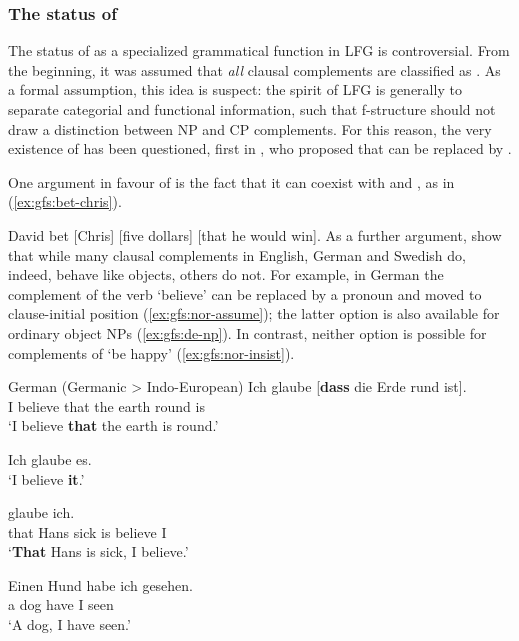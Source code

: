 \documentclass[output=paper]{../langscibook}
\begin{document}
 \subsubsection{The status of \COMP\label{sect:gfs:comp}}
 
 The status of \COMP as a specialized grammatical function in LFG is controversial. From the beginning, it was assumed that \textit{all} clausal complements are classified as \COMP \citep{kaplan-zaenen1989-fprec,BresnanEtAl2016}. As a formal assumption, this idea is suspect: the spirit of LFG is generally to separate categorial and functional information, such that f-structure should not draw a distinction between NP and CP complements. For this reason, the very existence of \COMP has been questioned, first in \citet{AlsinaMohananMohanan1996}, who proposed that \COMP can be replaced by \OBJ.
 
 One argument in favour of \COMP is the fact that it can coexist with \OBJ and {\OBJTHETA}, as in (\ref{ex:gfs:bet-chris}).
 
 \ea\label{ex:gfs:bet-chris}
    David bet [Chris]\textsubscript{\OBJ} [five dollars]\textsubscript{{}} [that he would win]\textsubscript{\COMP}.
 \z
As a further argument, \citet{DL00} show that while many clausal complements in English, German and Swedish do, indeed, behave like objects, others do not. For example, in German the complement of the verb `believe' can be replaced by a pronoun and moved to clause-initial position (\ref{ex:gfs:nor-assume}); the latter option is also available for ordinary object NPs (\ref{ex:gfs:de-np}). In contrast, neither option is possible for complements of `be happy' (\ref{ex:gfs:nor-insist}).
 
 \ea German (Germanic > Indo-European)\label{ex:gfs:nor-assume}
    \ea
        \gll Ich glaube [\textbf{dass} die Erde rund ist].\\
        I believe \phantom{[}that the earth round is\\
        \glt `I believe \textbf{that} the earth is round.'
        
        \ex Ich glaube es.\\
        `I believe \textbf{it}.'
        
        \ex
         glaube ich.\\
        {} that Hans sick is believe I\\
        \glt `\textbf{That} Hans is sick, I believe.'
    \z
    \z
    
    \ea\label{ex:gfs:de-np}
      \gll Einen Hund habe ich gesehen.\\
      a dog have I seen\\
      \glt `A dog, I have seen.'
    \z
    
\end{document}
